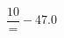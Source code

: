 \documentclass[preview]{standalone}
\begin{document}
\begin{align*}
\dfrac{ 10 }= -47.0
\end{align*}
\end{document}
